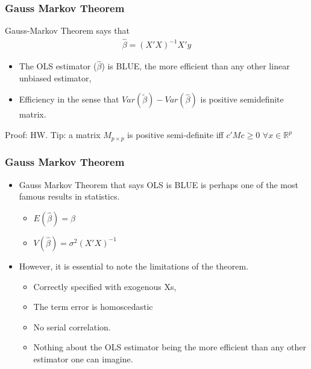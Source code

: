 \documentclass[
  shownotes,
  xcolor={svgnames},
  hyperref={colorlinks,citecolor=DarkBlue,linkcolor=DarkRed,urlcolor=DarkBlue}
  , aspectratio=169]{beamer}
\begin{document}
\begin{frame}
\frametitle{Gauss Markov Theorem}


Gauss-Markov Theorem says that 
\bigskip
\begin{align}
 \hat \beta = (X'X)^{-1} X'y
\end{align}

\bigskip

\begin{itemize}
  \item The OLS estimator ($\hat \beta$) is BLUE, the more efficient than any other linear unbiased estimator, 
  \medskip
  \item Efficiency in the sense that  $Var(\tilde \beta) - Var(\hat \beta)$ is positive semidefinite matrix.
\end{itemize}

\bigskip
\tiny Proof: HW. Tip: a matrix $M_{p\times p}$ is positive semi-definite iff $c'Mc\geq0$ $\forall x\in \mathbb{R}^p$

\end{frame}


\begin{frame}
\frametitle{Gauss Markov Theorem}

\begin{itemize}
  \item Gauss Markov Theorem that says OLS is BLUE is perhaps one of the most famous results in statistics. 
  
  \begin{itemize}
    \item $E(\hat\beta) = \beta$
    \medskip 
    \item $V(\hat \beta ) = \sigma^2 (X'X)^{-1}$
  \end{itemize}
  
\bigskip
  \item However, it is essential to note the limitations of the theorem. 

  \begin{itemize}
    \footnotesize
    \item Correctly specified with exogenous Xs, 
      \medskip 
    \item The term error is homoscedastic 
      \medskip 
    \item No serial correlation.
      \medskip 
    \item Nothing about the OLS estimator being the more efficient than any other estimator one can imagine.
  \end{itemize}
    
  

\end{itemize}

\end{frame}
\end{document}
